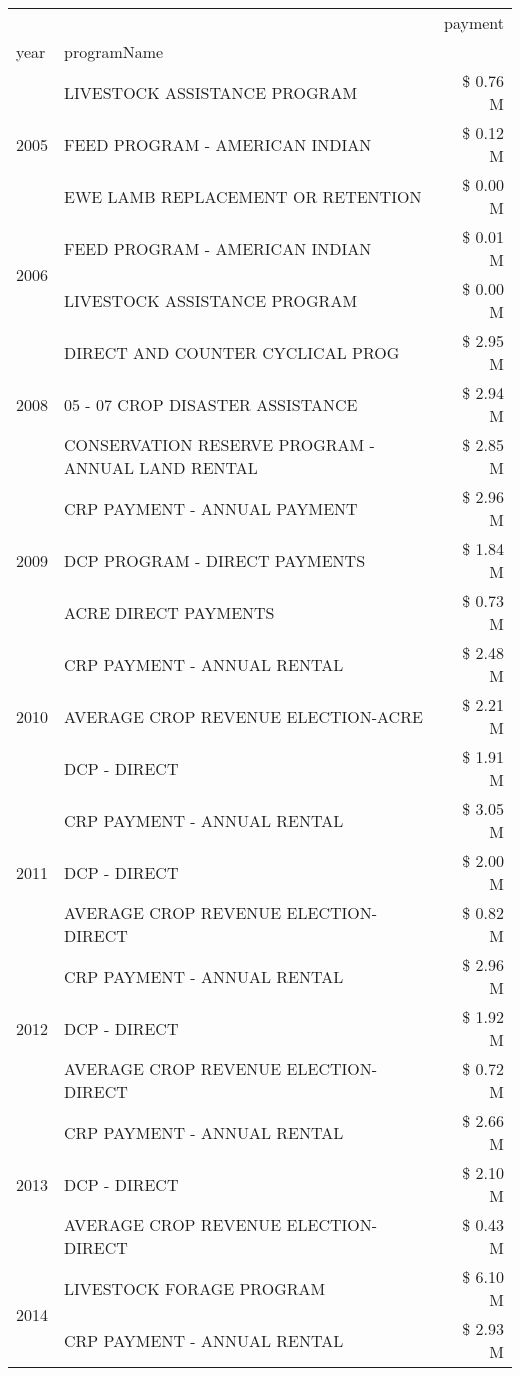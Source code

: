 \begin{tabular}{llr}
\toprule
 &  & payment \\
year & programName &  \\
\midrule
\multirow[t]{3}{*}{2005} & LIVESTOCK ASSISTANCE PROGRAM & \$ 0.76 M \\
 & FEED PROGRAM - AMERICAN INDIAN & \$ 0.12 M \\
 & EWE LAMB REPLACEMENT OR RETENTION & \$ 0.00 M \\
\cline{1-3}
\multirow[t]{2}{*}{2006} & FEED PROGRAM - AMERICAN INDIAN & \$ 0.01 M \\
 & LIVESTOCK ASSISTANCE PROGRAM & \$ 0.00 M \\
\cline{1-3}
\multirow[t]{3}{*}{2008} & DIRECT AND COUNTER CYCLICAL PROG & \$ 2.95 M \\
 & 05 - 07 CROP DISASTER ASSISTANCE & \$ 2.94 M \\
 & CONSERVATION RESERVE PROGRAM - ANNUAL LAND RENTAL & \$ 2.85 M \\
\cline{1-3}
\multirow[t]{3}{*}{2009} & CRP PAYMENT - ANNUAL PAYMENT & \$ 2.96 M \\
 & DCP PROGRAM - DIRECT PAYMENTS & \$ 1.84 M \\
 & ACRE DIRECT PAYMENTS & \$ 0.73 M \\
\cline{1-3}
\multirow[t]{3}{*}{2010} & CRP PAYMENT - ANNUAL RENTAL & \$ 2.48 M \\
 & AVERAGE CROP REVENUE ELECTION-ACRE & \$ 2.21 M \\
 & DCP - DIRECT & \$ 1.91 M \\
\cline{1-3}
\multirow[t]{3}{*}{2011} & CRP PAYMENT - ANNUAL RENTAL & \$ 3.05 M \\
 & DCP - DIRECT & \$ 2.00 M \\
 & AVERAGE CROP REVENUE ELECTION-DIRECT & \$ 0.82 M \\
\cline{1-3}
\multirow[t]{3}{*}{2012} & CRP PAYMENT - ANNUAL RENTAL & \$ 2.96 M \\
 & DCP - DIRECT & \$ 1.92 M \\
 & AVERAGE CROP REVENUE ELECTION-DIRECT & \$ 0.72 M \\
\cline{1-3}
\multirow[t]{3}{*}{2013} & CRP PAYMENT - ANNUAL RENTAL & \$ 2.66 M \\
 & DCP - DIRECT & \$ 2.10 M \\
 & AVERAGE CROP REVENUE ELECTION-DIRECT & \$ 0.43 M \\
\cline{1-3}
\multirow[t]{3}{*}{2014} & LIVESTOCK FORAGE PROGRAM & \$ 6.10 M \\
 & CRP PAYMENT - ANNUAL RENTAL & \$ 2.93 M \\

\end{tabular}
